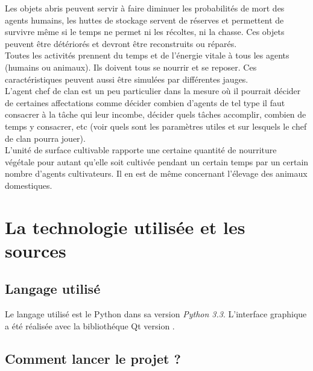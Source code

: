 \documentclass[12pt]{article}
\begin{document}
Les objets abris peuvent servir à faire diminuer les probabilités de mort des 
agents humains, les huttes de stockage servent de réserves et permettent de 
survivre même si le temps ne permet ni les récoltes, ni la chasse. Ces objets 
peuvent être détériorés et devront être reconstruits ou réparés.\\

Toutes les activités prennent du temps et de l'énergie vitale à tous les agents 
(humains ou animaux). Ils doivent tous se nourrir et se reposer. Ces 
caractéristiques peuvent aussi être simulées par différentes jauges.\\

L'agent chef de clan est un peu particulier dans la mesure où il pourrait 
décider de certaines affectations comme décider combien d'agents de tel type 
il faut consacrer à la tâche qui leur incombe, décider quels tâches accomplir, 
combien de temps y consacrer, etc (voir quels sont les paramètres utiles et 
sur lesquels le chef de clan pourra jouer).\\

L'unité de surface cultivable rapporte une certaine quantité de nourriture 
végétale pour autant qu'elle soit cultivée pendant un certain temps par un 
certain nombre d'agents cultivateurs. Il en est de même concernant l'élevage 
des animaux domestiques.\\



\section{La technologie utilisée et les sources}

	\subsection{Langage utilisé}

Le langage utilisé est le Python dans sa version \textit{Python 3.3}. 
L'interface graphique a été réalisée avec la bibliothéque Qt version .

	\subsection{Comment lancer le projet ?}
\end{document}
